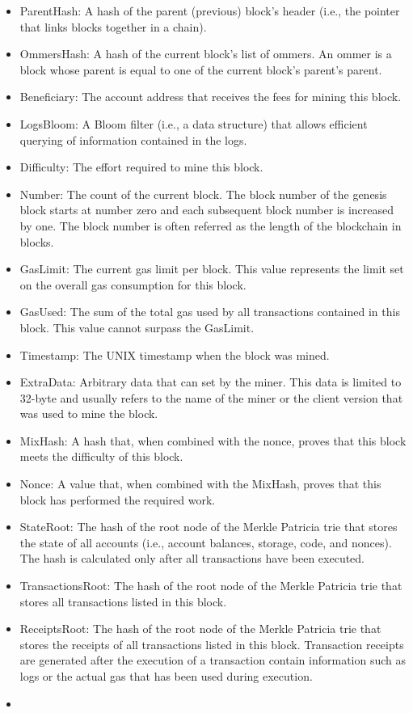         \begin{itemize}
            \item ParentHash: A hash of the parent (previous) block's header (i.e., the pointer that links blocks together in a chain).
            \item  OmmersHash: A hash of the current block's list of ommers. An ommer is a block whose parent is equal to one of the current block's parent's parent.
            \item Beneficiary: The account address that receives the fees for mining this block.
            \item LogsBloom: A Bloom filter (i.e., a data structure) that allows efficient querying of information contained in the logs.
            \item Difficulty: The effort required to mine this block.
            \item Number: The count of the current block. The block number of the genesis block starts at number zero and each subsequent block number is increased by one.
                The block number is often referred as the length of the blockchain in blocks.
            \item GasLimit: The current gas limit per block. This value represents the limit set on the overall gas consumption for this block.
            \item GasUsed: The sum of the total gas used by all transactions contained in this block. This value cannot surpass the GasLimit.
            \item Timestamp: The UNIX timestamp when the block was mined.
            \item ExtraData: Arbitrary data that can set by the miner. This data is limited to 32-byte and usually refers to the name of the miner or the client version that was used to mine the block.
            \item MixHash: A hash that, when combined with the nonce, proves that this block meets the difficulty of this block.
            \item Nonce: A value that, when combined with the MixHash, proves that this block has performed the required work.
            \item StateRoot: The hash of the root node of the Merkle Patricia trie that stores the state of all accounts (i.e., account balances, storage, code, and nonces).  The hash is calculated only after all transactions have been executed.
            \item TransactionsRoot: The hash of the root node of the Merkle Patricia trie that stores all transactions listed in this block.
            \item ReceiptsRoot: The hash of the root node of the Merkle Patricia trie that stores the receipts of all transactions listed in this block.
                Transaction receipts are generated after the execution of a transaction contain information such as logs or the actual gas that has been used during execution.
            \item 

        \end{itemize}

